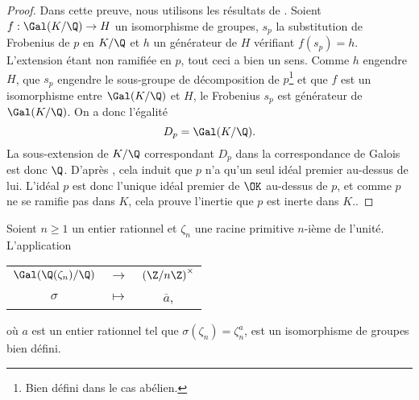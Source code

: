 \begin{proof}
	Dans cette preuve, nous utilisons les résultats de \cite[ch. 3 § 4 et 5]{Kraus}. Soient $f : \Gal(K/\Q) \to H$ un isomorphisme de groupes, $s_p$ la substitution de Frobenius de $p$ en $K/\Q$ et $h$ un générateur de $H$ vérifiant $f(s_p) = h$. L'extension étant non ramifiée en $p$, tout ceci a bien un sens. Comme $h$ engendre $H$, que $s_p$ engendre le sous-groupe de décomposition de $p$\footnote{Bien défini dans le cas abélien.} et que $f$ est un isomorphisme entre $\Gal(K/\Q)$ et $H$, le Frobenius $s_p$ est générateur de $\Gal(K/\Q)$. On a donc l'égalité \[D_p = \Gal(K/\Q).\] La sous-extension de $K/\Q$ correspondant $D_p$ dans la correspondance de Galois est donc $\Q$. D'après \cite[lemme 3.9]{Kraus}, cela induit que $p$ n'a qu'un seul idéal premier au-dessus de lui. L'idéal $p$ est donc l'unique idéal premier de $\OK$ au-dessus de $p$, et comme $p$ ne se ramifie pas dans $K$, cela prouve l'inertie que $p$ est inerte dans $K$..

\end{proof}

\begin{lemme}\label{iso-Z/nZ*}
	Soient $n \geq 1$ un entier rationnel et $\zeta_n$ une racine primitive $n$-ième de l'unité. L'application 
\begin{center}
	\begin{tabular}{ccc}
		$\Gal(\Q(\zeta_n)/\Q)$ & $\longrightarrow$ & $\left(\Z/n\Z\right)^\times$ \\
		$\sigma$	& $\longmapsto$ & $\overline{a}$,
	\end{tabular}
\end{center}
où $a$ est un entier rationnel tel que $\sigma(\zeta_n) = \zeta_n^a$, est un isomorphisme de groupes bien défini.
\end{lemme}

